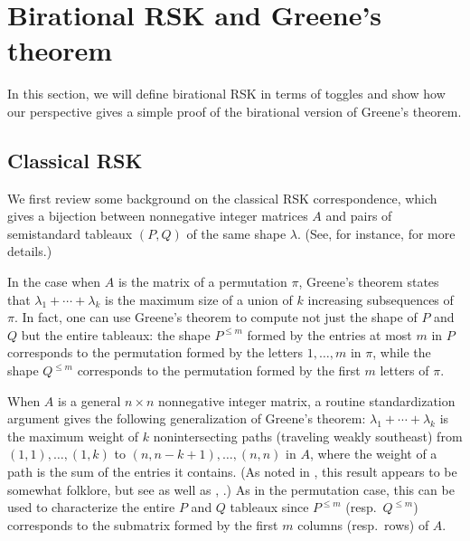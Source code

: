 \documentclass[ALCO,Unicode,published]{cedram}
\numberwithin{equation}{section}
\begin{document}



\fi

























\section{Birational RSK and Greene's theorem} \label{section:greenestheorem}

In this section, we will define birational RSK in terms of toggles and show how our perspective gives a simple proof of the birational version of Greene's theorem.

\subsection{Classical RSK} \label{sec:classical-rsk}

We first review some background on the classical RSK correspondence, which gives a bijection between nonnegative integer matrices $A$ and pairs of semistandard tableaux $(P,Q)$ of the same shape $\lambda$. (See, for instance, \cite{sagan} for more details.)

In the case when $A$ is the matrix of a permutation $\pi$, Greene's theorem \cite{greene} states that $\lambda_1 + \cdots + \lambda_k$ is the maximum size of a union of $k$ increasing subsequences of $\pi$. In fact, one can use Greene's theorem to compute not just the shape of $P$ and $Q$ but the entire tableaux: the shape $P^{\leq m}$ formed by the entries at most $m$ in $P$ corresponds to the permutation formed by the letters $1, \dots, m$ in $\pi$, while the shape $Q^{\leq m}$ corresponds to the permutation formed by the first $m$ letters of $\pi$.

When $A$ is a general $n \times n$ nonnegative integer matrix, a routine standardization argument gives the following generalization of Greene's theorem: $\lambda_1 + \cdots + \lambda_k$ is the maximum weight of $k$ nonintersecting paths (traveling weakly southeast) from $(1,1), \dots, (1,k)$ to $(n,n-k+1), \dots, (n,n)$ in $A$, where the weight of a path is the sum of the entries it contains. (As noted in \cite{farberhopkinstrongsiriwat}, this result appears to be somewhat folklore, but see \cite[Thm.\ 2.5]{noumiyamada} as well as \cite[Thm.\ 12]{krattenthaler}, \cite[Thm.\ 4.8.10]{sagan}.)
As in the permutation case, this can be used to characterize the entire $P$ and $Q$ tableaux since $P^{\leq m}$ (resp.\ $Q^{\leq m}$) corresponds to the submatrix formed by the first $m$ columns (resp.\ rows) of $A$. 
\end{document}
